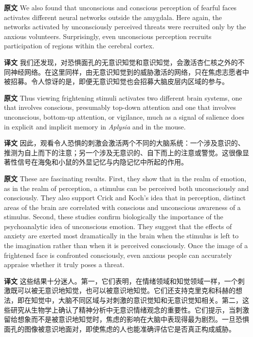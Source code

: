 \documentclass[UTF8,zihao=-4]{ctexart}
\newcommand{\BodyFont}{\fontsize{10.5pt}{15.5pt}\selectfont}
\newcommand{\origlabel}{\textbf{原文}\quad}
\newcommand{\translabel}{\textbf{译文}\quad}
\newenvironment{enblock}{\par\noindent\begingroup\BodyFont\origlabel}{\par\endgroup}
\newenvironment{zhblock}{\par\noindent\begingroup\BodyFont\translabel}{\par\endgroup\vspace{0.35em}}
\begin{document}
\begin{enblock}
We also found that unconscious and conscious perception of fearful faces activates different neural networks outside the amygdala. Here again, the networks activated by unconsciously perceived threats were recruited only by the anxious volunteers. Surprisingly, even unconscious perception recruits participation of regions within the cerebral cortex.
\end{enblock}
\begin{zhblock}
我们还发现，对恐惧面孔的无意识知觉和意识知觉，会激活杏仁核之外的不同神经网络。在这里同样，由无意识知觉到的威胁激活的网络，只在焦虑志愿者中被招募。令人惊讶的是，即便无意识知觉也会招募大脑皮层内区域的参与。\end{zhblock}

\begin{enblock}
Thus viewing frightening stimuli activates two different brain systems, one that involves conscious, presumably top-down attention and one that involves unconscious, bottom-up attention, or vigilance, much as a signal of salience does in explicit and implicit memory in \emph{Aplysia} and in the mouse.
\end{enblock}
\begin{zhblock}
因此，观看令人恐惧的刺激会激活两个不同的大脑系统：一个涉及意识的、推测为自上而下的注意；另一个涉及无意识的、自下而上的注意或警觉。这很像显著性信号在海兔和小鼠的外显记忆与内隐记忆中所起的作用。\end{zhblock}

\begin{enblock}
These are fascinating results. First, they show that in the realm of emotion, as in the realm of perception, a stimulus can be perceived both unconsciously and consciously. They also support Crick and Koch's idea that in perception, distinct areas of the brain are correlated with conscious and unconscious awareness of a stimulus. Second, these studies confirm biologically the importance of the psychoanalytic idea of unconscious emotion. They suggest that the effects of anxiety are exerted most dramatically in the brain when the stimulus is left to the imagination rather than when it is perceived consciously. Once the image of a frightened face is confronted consciously, even anxious people can accurately appraise whether it truly poses a threat.
\end{enblock}
\begin{zhblock}
这些结果十分迷人。第一，它们表明，在情绪领域和知觉领域一样，一个刺激既可以被无意识地知觉，也可以被意识地知觉。它们还支持克里克和科赫的想法，即在知觉中，大脑不同区域与对刺激的意识觉知和无意识觉知相关。第二，这些研究从生物学上确认了精神分析中无意识情绪观念的重要性。它们提示，当刺激留给想象而不是被意识地知觉时，焦虑的影响在大脑中表现得最为剧烈。一旦恐惧面孔的图像被意识地面对，即使焦虑的人也能准确评估它是否真正构成威胁。\end{zhblock}
\end{document}
